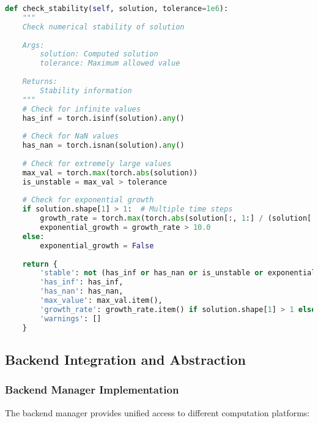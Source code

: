\begin{lstlisting}[language=Python, caption=Stability Analysis]
def check_stability(self, solution, tolerance=1e6):
    """
    Check numerical stability of solution
    
    Args:
        solution: Computed solution
        tolerance: Maximum allowed value
    
    Returns:
        Stability information
    """
    # Check for infinite values
    has_inf = torch.isinf(solution).any()
    
    # Check for NaN values
    has_nan = torch.isnan(solution).any()
    
    # Check for extremely large values
    max_val = torch.max(torch.abs(solution))
    is_unstable = max_val > tolerance
    
    # Check for exponential growth
    if solution.shape[1] > 1:  # Multiple time steps
        growth_rate = torch.max(torch.abs(solution[:, 1:] / (solution[:, :-1] + 1e-12)))
        exponential_growth = growth_rate > 10.0
    else:
        exponential_growth = False
    
    return {
        'stable': not (has_inf or has_nan or is_unstable or exponential_growth),
        'has_inf': has_inf,
        'has_nan': has_nan,
        'max_value': max_val.item(),
        'growth_rate': growth_rate.item() if solution.shape[1] > 1 else None,
        'warnings': []
    }
\end{lstlisting}

\subsection{Backend Integration and Abstraction}

\subsubsection{Backend Manager Implementation}

The backend manager provides unified access to different computation platforms:

